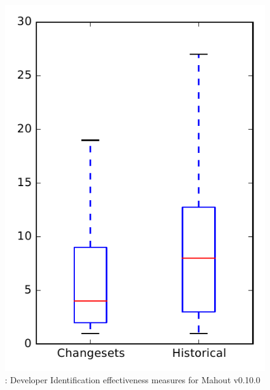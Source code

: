 
\begin{figure}
\centering
\includegraphics[height=0.4\textheight]{figures/dit/rq2_mahout_no_outlier}
\caption{\dtwo: Developer Identification effectiveness measures for Mahout v0.10.0}
\label{fig:dit:rq2:mahout}
\end{figure}

